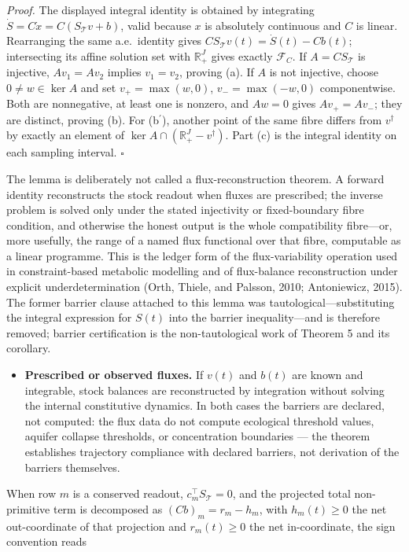\documentclass[11pt]{article}
\begin{document}
\emph{Proof.} The displayed integral identity is obtained by integrating \(\dot S=C\dot x=C(S_{\mathcal{T}}v+b)\), valid because \(x\) is absolutely continuous and \(C\) is linear. Rearranging the same a.e.\ identity gives \(CS_{\mathcal{T}}v(t)=\dot S(t)-Cb(t)\); intersecting its affine solution set with \(\mathbb R_+^J\) gives exactly \(\mathcal F_C\). If \(A=CS_{\mathcal{T}}\) is injective, \(Av_1=Av_2\) implies \(v_1=v_2\), proving (a). If \(A\) is not injective, choose \(0\ne w\in\ker A\) and set \(v_+=\max(w,0)\), \(v_-=\max(-w,0)\) componentwise. Both are nonnegative, at least one is nonzero, and \(Aw=0\) gives \(Av_+=Av_-\); they are distinct, proving (b). For (b$^\prime$), another point of the same fibre differs from \(v^\dagger\) by exactly an element of \(\ker A\cap(\mathbb R_+^J-v^\dagger)\). Part (c) is the integral identity on each sampling interval. \(\square\)

The lemma is deliberately not called a flux-reconstruction theorem. A forward identity reconstructs the stock readout when fluxes are prescribed; the inverse problem is solved only under the stated injectivity or fixed-boundary fibre condition, and otherwise the honest output is the whole compatibility fibre---or, more usefully, the range of a named flux functional over that fibre, computable as a linear programme. This is the ledger form of the flux-variability operation used in constraint-based metabolic modelling and of flux-balance reconstruction under explicit underdetermination (Orth, Thiele, and Palsson, 2010; Antoniewicz, 2015). The former barrier clause attached to this lemma was tautological---substituting the integral expression for \(S(t)\) into the barrier inequality---and is therefore removed; barrier certification is the non-tautological work of Theorem 5 and its corollary.

\begin{itemize}\setlength{\itemsep}{2pt}
\item \textbf{Prescribed or observed fluxes.} If \(v(t)\) and \(b(t)\) are known and integrable, stock balances are reconstructed by integration without solving the internal constitutive dynamics. In both cases the barriers are declared, not computed: the flux data do not compute ecological threshold values, aquifer collapse thresholds, or concentration boundaries --- the theorem establishes trajectory compliance with declared barriers, not derivation of the barriers themselves.
\end{itemize}

When row \(m\) is a conserved readout, \(c_m^\top S_{\mathcal{T}}=0\), and the projected total non-primitive term is decomposed as \((Cb)_m=r_m-h_m\), with \(h_m(t) \ge 0\) the net out-coordinate of that projection and \(r_m(t) \ge 0\) the net in-coordinate, the sign convention reads 
\end{document}

